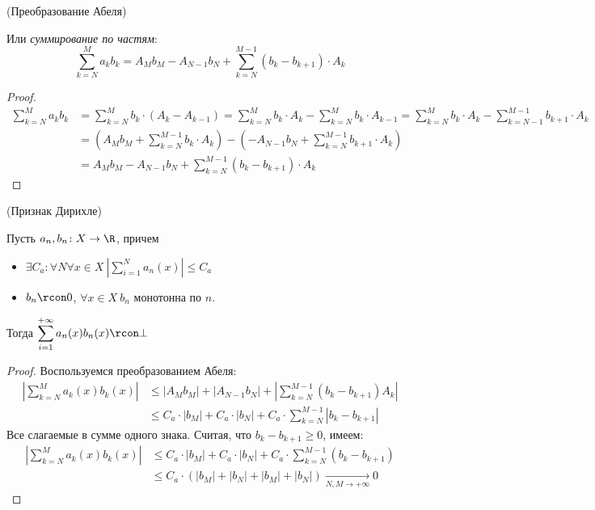 \begin{lemma}(Преобразование Абеля)

	Или \textit{суммирование по частям}:
\[
	\sum_{k = N}^{M}{a_k b_k} = A_M b_M - A_{N - 1} b_N + \sum_{k = N}^{M - 1}
	{(b_k - b_{k + 1}) \cdot A_k}
\]
\end{lemma}
\begin{proof}
\begin{align*}
	\sum_{k = N}^{M}{a_k b_k} &= \sum_{k = N}^{M}{b_k \cdot (A_k - A_{k - 1})}
	= \sum_{k = N}^{M}{b_k \cdot A_k} - \sum_{k = N}^{M}{b_k \cdot A_{k - 1}} 
	= \sum_{k = N}^{M}{b_k \cdot A_k} - \sum_{k = N - 1}^{M - 1}{b_{k + 1} \cdot A_k} \\
	&= \left(A_M b_M + \sum_{k = N}^{M - 1}{b_k \cdot A_k}\right)
	- \left(-A_{N - 1} b_N + \sum_{k = N}^{M - 1}{b_{k + 1} \cdot A_k}\right) \\
	&= A_M b_M - A_{N - 1} b_N + \sum_{k = N}^{M - 1}{(b_k - b_{k + 1}) \cdot A_k}
\end{align*}
\end{proof}

\begin{theorem}(Признак Дирихле)

    Пусть $a_n, b_n \colon X \to \R$, причем
\begin{itemize}
    \item $\displaystyle \exists C_a\colon \forall
   N \forall x \in X~ \left| \sum_{i = 1}^{N}{a_n(x)} \right| \leqslant C_a$
    \item $b_n \rcon 0$, $\forall x \in X~ b_n$ монотонна по $n$.
\end{itemize}
    Тогда
    $\displaystyle \sum_{i = 1}^{+\infty}{a_n(x) b_n(x)} \rcon \bot$
\end{theorem}
\begin{proof}
    Воспользуемся преобразованием Абеля:
\begin{align*}
    \left|\sum_{k = N}^{M}{a_k(x) b_k(x)}\right| &\leqslant |A_M b_M|
    + |A_{N - 1}b_N| + \left| \sum_{k = N}^{M - 1}{(b_k - b_{k + 1})A_k}
    \right|\\
    &\leqslant C_a \cdot |b_M| + C_a \cdot |b_N| + C_a \cdot
    \sum_{k = N}^{M - 1}{|b_k - b_{k + 1}|}
\end{align*}
    Все слагаемые в сумме одного знака. Считая, что $b_k - b_{k + 1} \geqslant
    0$, имеем:
\begin{align*}
    \left|\sum_{k = N}^{M}{a_k(x) b_k(x)}\right| &\leqslant C_a \cdot |b_M| +
    C_a \cdot |b_N| + C_a \cdot \sum_{k = N}^{M - 1}{(b_k - b_{k + 1})} \\
    &\leqslant C_a \cdot (|b_M| + |b_N| + |b_M| + |b_N|) \xrightarrow[N, M \to
    +\infty]{} 0
\end{align*}
\end{proof}

